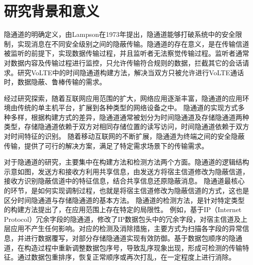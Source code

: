 \section{研究背景和意义}
\label{sec:intro:backgroud}



隐通道的明确定义，由Lampson在1973年提出，隐通道能够打破系统中的安全限制，实现消息在不同安全级别之间的隐蔽传输。隐通道的存在意义，是在传输信道被监听的前提下，实现数据传输过程，并且监听者无法察觉传输过程。监听者通常对数据内容及传输过程进行监控，只允许传输符合规则的数据，拦截其它的会话请求。研究VoLTE中的时间隐通道构建方法，解决当双方只被允许进行VoLTE通话时，数据隐蔽、鲁棒传输的需求。

经过研究探索，随着互联网应用范围的扩大，网络应用逐渐丰富，隐通道的应用环境由传统的单主机平台，扩展到各种类型的网络设备之中。
隐通道的实现方式多种多样，根据构建方式的差异，隐通道通常被划分为时间隐通道及存储隐通道两种类型，存储隐通道依赖于双方对相同存储位置的读写访问，时间隐通道依赖于双方对时间特征的识别。
随着移动互联网的不断扩展，隐通道为终端之间的安全隐蔽传输，提供了可行的解决方案，满足了特定需求场景下的传输需求。


对于隐通道的研究，主要集中在构建方法和检测方法两个方面。隐通道的逻辑结构示意如图，发送方和接收方利用共享信息，由发送方将宿主信道修改为隐蔽信道，接收方识别隐蔽信道中的特征信息，结合共享信息还原隐蔽消息。
隐通道最核心的环节，是如何实现调制过程，也就是将宿主信道修改为隐蔽信道的方式，这也是区分时间隐通道与存储隐通道的基本方法。
隐通道的检测方法，是针对特定类型的构建方法提出了，在应用范围上存在特定的局限性。
例如，基于IP（Internet Protocol）冗余字段的隐通道，修改了IP数据包头中的冗余字段，对宿主信道及上层应用不产生任何影响。对应的检测及消除措施，主要方式为扫描各字段的异常信息，并进行数据覆写，对部分存储隐通道实现有效防御。基于数据包顺序的隐通道，在构造过程中重新调整数据包序号，导致乱序现象出现，形成可检测的传输特征。通过数据包重排序，恢复正常顺序或再次打乱，在一定程度上进行消除。

